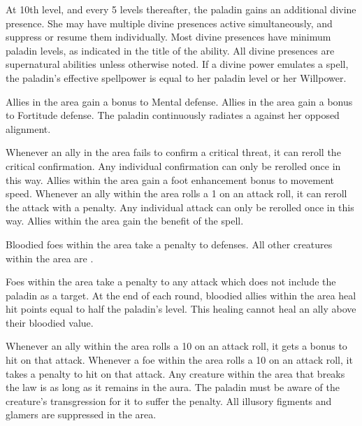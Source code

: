 At 10th level, and every 5 levels thereafter, the paladin gains an additional divine presence.
She may have multiple divine presences active simultaneously, and suppress or resume them individually.
Most divine presences have minimum paladin levels, as indicated in the title of the ability.
All divine presences are supernatural abilities unless otherwise noted.
If a divine power emulates a spell, the paladin's effective spellpower is equal to her paladin level or her Willpower.

Allies in the area gain a  bonus to Mental defense.
Allies in the area gain a  bonus to Fortitude defense.
 The paladin continuously radiates a 
against her opposed alignment.

Whenever an ally in the area fails to confirm a critical threat, it can reroll the critical confirmation.
Any individual confirmation can only be rerolled once in this way.
Allies within the area gain a  foot enhancement bonus to movement speed.
Whenever an ally within the area rolls a 1 on an attack roll, it can reroll the attack with a  penalty.
Any individual attack can only be rerolled once in this way.
 Allies within the area gain the benefit of the 
spell.

Bloodied foes within the area take a  penalty to defenses.
All other creatures within the area are \vulnerable.

Foes within the area take a  penalty to any attack which does not include the paladin as a target.
At the end of each round, bloodied allies within the area heal hit points equal to half the paladin's level.
This healing cannot heal an ally above their bloodied value.

Whenever an ally within the area rolls a 10 on an attack roll, it gets a  bonus to hit on that attack.
Whenever a foe within the area rolls a 10 on an attack roll, it takes a  penalty to hit on that attack.
Any creature within the area that breaks the law is \vulnerable as long as it remains in the aura.
The paladin must be aware of the creature's transgression for it to suffer the penalty.
All illusory figments and glamers are suppressed in the area.

